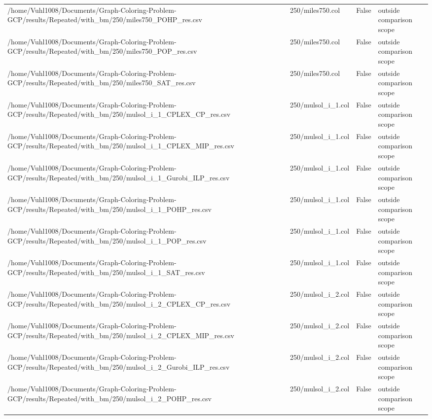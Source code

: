 \begin{table}[htbp]
\begin{tabular}{llll}
/home/Vuhl1008/Documents/Graph-Coloring-Problem-GCP/results/Repeated/with\_bm/250/miles750\_POHP\_res.csv & 250/miles750.col & False & outside comparison scope \\
/home/Vuhl1008/Documents/Graph-Coloring-Problem-GCP/results/Repeated/with\_bm/250/miles750\_POP\_res.csv & 250/miles750.col & False & outside comparison scope \\
/home/Vuhl1008/Documents/Graph-Coloring-Problem-GCP/results/Repeated/with\_bm/250/miles750\_SAT\_res.csv & 250/miles750.col & False & outside comparison scope \\
/home/Vuhl1008/Documents/Graph-Coloring-Problem-GCP/results/Repeated/with\_bm/250/mulsol\_i\_1\_CPLEX\_CP\_res.csv & 250/mulsol\_i\_1.col & False & outside comparison scope \\
/home/Vuhl1008/Documents/Graph-Coloring-Problem-GCP/results/Repeated/with\_bm/250/mulsol\_i\_1\_CPLEX\_MIP\_res.csv & 250/mulsol\_i\_1.col & False & outside comparison scope \\
/home/Vuhl1008/Documents/Graph-Coloring-Problem-GCP/results/Repeated/with\_bm/250/mulsol\_i\_1\_Gurobi\_ILP\_res.csv & 250/mulsol\_i\_1.col & False & outside comparison scope \\
/home/Vuhl1008/Documents/Graph-Coloring-Problem-GCP/results/Repeated/with\_bm/250/mulsol\_i\_1\_POHP\_res.csv & 250/mulsol\_i\_1.col & False & outside comparison scope \\
/home/Vuhl1008/Documents/Graph-Coloring-Problem-GCP/results/Repeated/with\_bm/250/mulsol\_i\_1\_POP\_res.csv & 250/mulsol\_i\_1.col & False & outside comparison scope \\
/home/Vuhl1008/Documents/Graph-Coloring-Problem-GCP/results/Repeated/with\_bm/250/mulsol\_i\_1\_SAT\_res.csv & 250/mulsol\_i\_1.col & False & outside comparison scope \\
/home/Vuhl1008/Documents/Graph-Coloring-Problem-GCP/results/Repeated/with\_bm/250/mulsol\_i\_2\_CPLEX\_CP\_res.csv & 250/mulsol\_i\_2.col & False & outside comparison scope \\
/home/Vuhl1008/Documents/Graph-Coloring-Problem-GCP/results/Repeated/with\_bm/250/mulsol\_i\_2\_CPLEX\_MIP\_res.csv & 250/mulsol\_i\_2.col & False & outside comparison scope \\
/home/Vuhl1008/Documents/Graph-Coloring-Problem-GCP/results/Repeated/with\_bm/250/mulsol\_i\_2\_Gurobi\_ILP\_res.csv & 250/mulsol\_i\_2.col & False & outside comparison scope \\
/home/Vuhl1008/Documents/Graph-Coloring-Problem-GCP/results/Repeated/with\_bm/250/mulsol\_i\_2\_POHP\_res.csv & 250/mulsol\_i\_2.col & False & outside comparison scope \\

\end{tabular}
\end{table}
